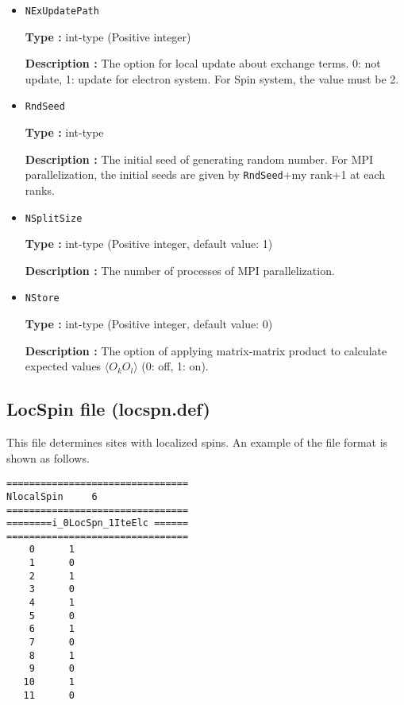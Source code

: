 \begin{itemize}
{\bf Description :} The sample numbers to calculate the expected values.

\item \verb|NExUpdatePath|

{\bf Type :} int-type (Positive integer)

{\bf Description :}  The option for local update about exchange terms. 0: not update, 1: update for electron system. For Spin system, the value must be 2.

\item \verb|RndSeed|

{\bf Type :} int-type 

{\bf Description :} The initial seed of generating random number. For MPI parallelization, the initial seeds are given by \verb|RndSeed|+my rank+1 at each ranks. 

 \item \verb|NSplitSize|

{\bf Type :} int-type (Positive integer, default value: 1)

{\bf Description :} The number of processes of MPI parallelization.

\item \verb|NStore|

{\bf Type :} int-type (Positive integer, default value: 0)

{\bf Description :} The option of applying matrix-matrix product to calculate expected values $\langle O_k O_l \rangle$ (0: off, 1: on).  
 
 \end{itemize}


\newpage
\subsection{LocSpin file (locspn.def)}
\label{Subsec:locspn}
This file determines sites with localized spins. An example of the file format is shown as follows.\\
\begin{minipage}{10cm}
\begin{screen}
\begin{verbatim}
================================ 
NlocalSpin     6  
================================ 
========i_0LocSpn_1IteElc ====== 
================================ 
    0      1
    1      0
    2      1
    3      0
    4      1
    5      0
    6      1
    7      0
    8      1
    9      0
   10      1
   11      0
\end{verbatim}
\end{screen}
\end{minipage}


